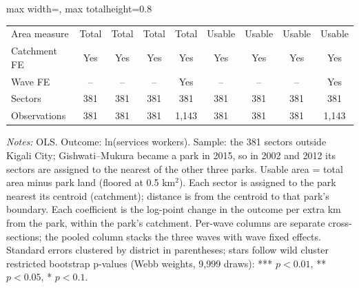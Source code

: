 \documentclass[11pt]{article}
\begin{document}
\begin{table}[H]
\begin{adjustbox}{max width=\textwidth, max totalheight=0.8\textheight}
\begin{tabular}{lcccccccc}
Area measure & Total & Total & Total & Total & Usable & Usable & Usable & Usable \\
Catchment FE & Yes & Yes & Yes & Yes & Yes & Yes & Yes & Yes \\
Wave FE & -- & -- & -- & Yes & -- & -- & -- & Yes \\
Sectors & 381 & 381 & 381 & 381 & 381 & 381 & 381 & 381 \\
Observations & 381 & 381 & 381 & 1,143 & 381 & 381 & 381 & 1,143 \\
\bottomrule
\end{tabular}
\end{adjustbox}
\begin{minipage}{0.97\textwidth}\scriptsize
\textit{Notes:} OLS. Outcome: ln(services workers). Sample: the 381 sectors outside Kigali City; Gishwati--Mukura became a park in 2015, so in 2002 and 2012 its sectors are assigned to the nearest of the other three parks. Usable area = total area minus park land (floored at 0.5 km$^2$). Each sector is assigned to the park nearest its centroid (catchment); distance is from the centroid to that park's boundary. Each coefficient is the log-point change in the outcome per extra km from the park, within the park's catchment. Per-wave columns are separate cross-sections; the pooled column stacks the three waves with wave fixed effects. Standard errors clustered by district in parentheses; stars follow wild cluster restricted bootstrap p-values (Webb weights, 9,999 draws): *** $p<0.01$, ** $p<0.05$, * $p<0.1$.
\end{minipage}
\end{table}
\clearpage
\end{document}
